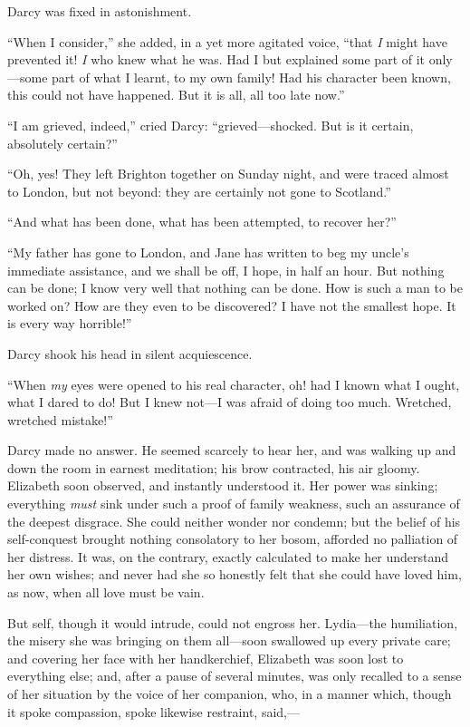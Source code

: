 Darcy was fixed in astonishment.

``When I consider,'' she added, in a yet more agitated voice, ``that \textit{I} might have prevented it! \textit{I} who knew what he was. Had I but explained some part of it only---some part of what I learnt, to my own family! Had his character been known, this could not have happened. But it is all, all too late now.''

``I am grieved, indeed,'' cried Darcy: ``grieved---shocked. But is it certain, absolutely certain?''

``Oh, yes! They left Brighton together on Sunday night, and were traced almost to London, but not beyond: they are certainly not gone to Scotland.''

``And what has been done, what has been attempted, to recover her?''

``My father has gone to London, and Jane has written to beg my uncle's immediate assistance, and we shall be off, I hope, in half an hour. But nothing can be done; I know very well that nothing can be done. How is such a man to be worked on? How are they even to be discovered? I have not the smallest hope. It is every way horrible!''

Darcy shook his head in silent acquiescence.

``When \textit{my} eyes were opened to his real character, oh! had I known what I ought, what I dared to do! But I knew not---I was afraid of doing too much. Wretched, wretched mistake!''

Darcy made no answer. He seemed scarcely to hear her, and was walking up and down the room in earnest meditation; his brow contracted, his air gloomy. Elizabeth soon observed, and instantly understood it. Her power was sinking; everything \textit{must} sink under such a proof of family weakness, such an assurance of the deepest disgrace. She could neither wonder nor condemn; but the belief of his self-conquest brought nothing consolatory to her bosom, afforded no palliation of her distress. It was, on the contrary, exactly calculated to make her understand her own wishes; and never had she so honestly felt that she could have loved him, as now, when all love must be vain.

But self, though it would intrude, could not engross her. Lydia---the humiliation, the misery she was bringing on them all---soon swallowed up every private care; and covering her face with her handkerchief, Elizabeth was soon lost to everything else; and, after a pause of several minutes, was only recalled to a sense of her situation by the voice of her companion, who, in a manner which, though it spoke compassion, spoke likewise restraint, said,---

